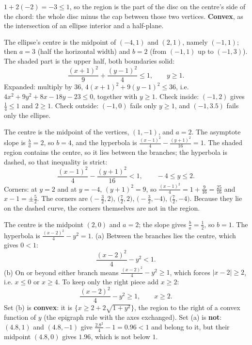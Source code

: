 \begin{solutions}
        $1+2(-2)=-3\le1$, so the region is the part of the disc on the
        centre's side of the chord: the whole disc minus the cap between
        those two vertices. \textbf{Convex}, as the intersection of an
        ellipse interior and a half-plane.
  \item The ellipse's centre is the midpoint of $(-4,1)$ and $(2,1)$,
        namely $(-1,1)$; then $a=3$ (half the horizontal width) and $b=2$
        (from $(-1,1)$ up to $(-1,3)$). The shaded part is the upper half,
        both boundaries solid:
        \[
          \frac{(x+1)^{2}}{9}+\frac{(y-1)^{2}}{4}\le1,\qquad y\ge1 .
        \]
        Expanded: multiply by $36$, $4(x+1)^{2}+9(y-1)^{2}\le36$, i.e.
        $4x^{2}+9y^{2}+8x-18y-23\le0$, together with $y\ge1$. Check
        inside: $(-1,2)$ gives $\tfrac14\le1$ and $2\ge1$. Check outside:
        $(-1,0)$ fails only $y\ge1$, and $(-1,3.5)$ fails only the ellipse.
  \item The centre is the midpoint of the vertices, $(1,-1)$, and
        $a=2$. The asymptote slope is $\tfrac{b}{a}=2$, so $b=4$, and the
        hyperbola is $\tfrac{(x-1)^{2}}{4}-\tfrac{(y+1)^{2}}{16}=1$. The
        shaded region contains the centre, so it lies between the branches;
        the hyperbola is dashed, so that inequality is strict:
        \[
          \frac{(x-1)^{2}}{4}-\frac{(y+1)^{2}}{16}<1,\qquad -4\le y\le2 .
        \]
        Corners: at $y=2$ and at $y=-4$, $(y+1)^{2}=9$, so
        $\tfrac{(x-1)^{2}}{4}=1+\tfrac{9}{16}=\tfrac{25}{16}$ and
        $x-1=\pm\tfrac52$. The corners are
        $\bigl(-\tfrac32,2\bigr)$, $\bigl(\tfrac72,2\bigr)$,
        $\bigl(-\tfrac32,-4\bigr)$, $\bigl(\tfrac72,-4\bigr)$. Because they
        lie on the dashed curve, the corners themselves are not in the
        region.
  \item The centre is the midpoint $(2,0)$ and $a=2$; the slope gives
        $\tfrac{b}{a}=\tfrac12$, so $b=1$. The hyperbola is
        $\tfrac{(x-2)^{2}}{4}-y^{2}=1$.
        (a) Between the branches lies the centre, which gives $0<1$:
        \[
          \frac{(x-2)^{2}}{4}-y^{2}<1 .
        \]
        (b) On or beyond either branch means
        $\tfrac{(x-2)^{2}}{4}-y^{2}\ge1$, which forces $|x-2|\ge2$, i.e.
        $x\le0$ or $x\ge4$. To keep only the right piece add $x\ge2$:
        \[
          \frac{(x-2)^{2}}{4}-y^{2}\ge1,\qquad x\ge2 .
        \]
        Set (b) is \textbf{convex}: it is $\{x\ge2+2\sqrt{1+y^{2}}\}$, the
        region to the right of a convex function of $y$ (the epigraph rule
        with the axes exchanged). Set (a) is \textbf{not}: $(4.8,1)$ and
        $(4.8,-1)$ give $\tfrac{2.8^{2}}{4}-1=0.96<1$ and belong to it,
        but their midpoint $(4.8,0)$ gives $1.96$, which is not below $1$.
\end{solutions}

